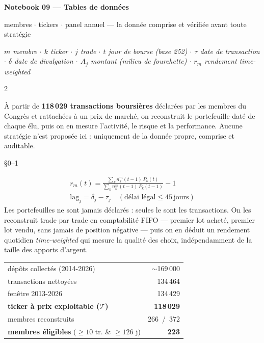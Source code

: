 \documentclass[11pt,a4paper]{article}
\newcommand{\titre}[2]{\vspace{4pt}{\large\bfseries\color{bleu}#1}\hfill{\footnotesize\color{gris}#2}\par
  \vspace{0pt}{\color{bleu}\hrule height 0.6pt}\vspace{4pt}}
\newcommand{\fin}{\vspace{5pt}{\color{gris}\hrule}\vspace{6pt}}
\begin{document}
{\centering
{\LARGE\bfseries Notebook 09 --- Tables de données\par}
\vspace{2pt}
{\small\color{gris}membres $\cdot$ tickers $\cdot$ panel annuel --- la donnée comprise et vérifiée avant toute stratégie\par}
\vspace{4pt}
{\footnotesize\itshape $m$ membre $\cdot$ $k$ ticker $\cdot$ $j$ trade $\cdot$ $t$ jour de bourse (base 252) $\cdot$
$\tau$ date de transaction $\cdot$ $\delta$ date de divulgation $\cdot$ $A_j$ montant (milieu de fourchette) $\cdot$
$r_m$ rendement \emph{time-weighted}\par}
\vspace{6pt}\par}

\begin{multicols}{2}

À partir de \textbf{118\,029 transactions boursières} déclarées par les membres du Congrès et
rattachées à un prix de marché, on reconstruit le portefeuille daté de chaque élu, puis on en
mesure l'activité, le risque et la performance. Aucune stratégie n'est proposée ici : uniquement
de la donnée propre, comprise et auditable.
\fin

\titre{1. Le moteur}{\S{}0--1}
{\small
\begin{gather*}
r_m(t)=\frac{\sum_k n_k^m(t{-}1)\,P_k(t)}{\sum_k n_k^m(t{-}1)\,P_k(t{-}1)}-1 \\[3pt]
\mathrm{lag}_j=\delta_j-\tau_j\quad(\text{délai légal}\le 45\,\text{jours})
\end{gather*}}
Les portefeuilles ne sont jamais déclarés : seules le sont les transactions. On les reconstruit
trade par trade en comptabilité FIFO --- premier lot acheté, premier lot vendu, sans jamais de
position négative --- puis on en déduit un rendement quotidien \emph{time-weighted} qui mesure la
qualité des choix, indépendamment de la taille des apports d'argent.
\vspace{2pt}
\begin{center}\footnotesize
\begin{tabular}{@{}lr@{}}
\toprule
dépôts collectés (2014-2026) & $\sim$169\,000\\
transactions nettoyées & 134\,464\\
fenêtre 2013-2026 & 134\,429\\
\textbf{ticker à prix exploitable ($\mathcal{T}$)} & \textbf{118\,029}\\
\midrule
membres reconstruits & 266\ /\ 372\\
\textbf{membres éligibles} ($\ge 10$ tr. \& $\ge 126$ j) & \textbf{223}\\
\bottomrule
\end{tabular}
\end{center}
\fin


\end{multicols}
\end{document}
